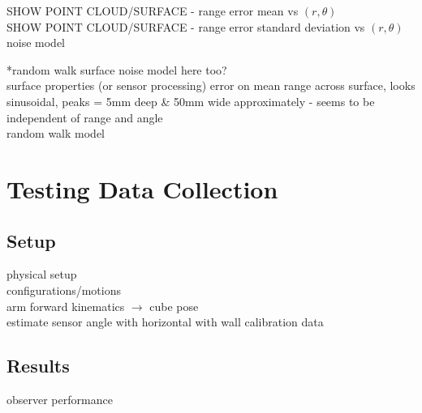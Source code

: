 		SHOW POINT CLOUD/SURFACE - range error mean vs $(r,\theta)$\\
		SHOW POINT CLOUD/SURFACE - range error standard deviation vs $(r,\theta)$\\		
		noise model
		
		*random walk surface noise model here too?\\
		surface properties (or sensor processing) error on mean range across surface, looks sinusoidal, peaks = 5mm deep \& 50mm wide approximately - seems to be independent of range and angle\\
		random walk model

\section{Testing Data Collection}
	\subsection{Setup}
		physical setup\\
		configurations/motions\\
		arm forward kinematics $\rightarrow$ cube pose\\
		estimate sensor angle with horizontal with wall calibration data		
		
	\subsection{Results}
		observer performance

